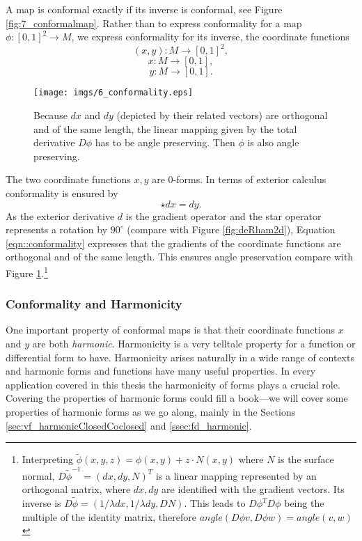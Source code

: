 A map is conformal exactly if its inverse is conformal, see Figure \ref{fig:7_conformalmap}. Rather than to express conformality for a map $\phi:[0,1]^2\rightarrow M$, we express conformality for its inverse, the coordinate functions
\[(x,y): M \rightarrow [0,1]^2,\]
\[x:M \rightarrow [0,1],\]
\[y:M \rightarrow [0,1].\]

\begin{figure}%
\begin{center}
\texttt{[image: imgs/6\_conformality.eps]}%
\end{center}
\caption{Because $dx$ and $dy$ (depicted by their related vectors) are orthogonal and of the same length, the linear mapping given by the total derivative $D\phi$ has to be angle preserving. Then $\phi$ is also angle preserving.}%
\label{fig:6_conformality}%
\end{figure}

The two coordinate functions $x,y$ are 0-forms. In terms of exterior calculus conformality is ensured by
\begin{equation}
 \star dx = dy.
 \label{eqn::conformality}
\end{equation}
As the exterior derivative $d$ is the gradient operator and the star operator represents a rotation by $90^\circ$ (compare with Figure \ref{fig:deRham2d}), Equation \ref{eqn::conformality} expresses that the gradients of the coordinate functions are orthogonal and of the same length. This ensures angle preservation compare with Figure \ref{fig:6_conformality}.\footnote{Interpreting $\tilde{\phi}(x,y,z) = \phi(x,y) + z\cdot N(x,y)$ where $N$ is the surface normal, $D\tilde{\phi}^{-1} = (dx ,dy,N)^T$ is a linear mapping represented by an orthogonal matrix, where $dx,dy$ are identified with the gradient vectors. Its inverse is $D\tilde{\phi} = (1/\lambda dx, 1/\lambda dy, DN)$.  This leads to $D\phi^T D\phi$ being the multiple of the identity matrix, therefore $angle (D\phi v , D\phi w )= angle(v,w)$}


\subsubsection{Conformality and Harmonicity}
\label{sec:cmp_harmonicity}

One important property of conformal maps is that their coordinate functions $x$ and $y$ are both \emph{harmonic}. Harmonicity is a very telltale property for a function or differential form to have. Harmonicity arises naturally in a wide range of contexts and harmonic forms and functions have many useful properties. In every application covered in this thesis the harmonicity of forms plays a crucial role. Covering the properties of harmonic forms could fill a book---we will cover some properties of harmonic forms as we go along, mainly in the Sections \ref{sec:vf_harmonicClosedCoclosed} and \ref{ssec:fd_harmonic}.

